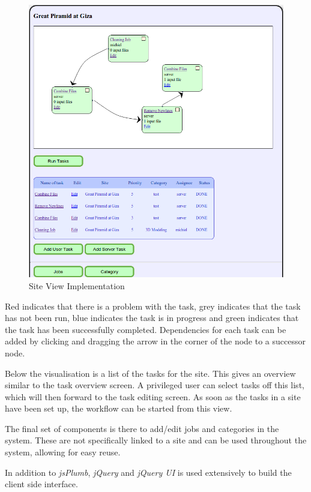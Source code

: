 \documentclass[12pt,a4paper]{report}
\begin{document}
\begin{description}
\begin{figure}[!h]
\begin{center}
            \includegraphics[scale=0.35]{figures/site_view_impl2.png}
        \end{center}
        \caption{Site View Implementation}
        \label{site_view_impl2}
    \end{figure}
    Red indicates that there is a problem with the task, grey indicates that the task has not
    been run, blue indicates the task is in progress and green indicates that
    the task has been successfully completed. Dependencies for each task can be
    added by clicking and dragging the arrow in the corner of the node to a
    successor node.

    Below the visualisation is a list of the tasks for the site. This gives an overview
    similar to the task overview screen. A privileged user can select tasks off
    this list, which will then forward to the task editing screen.
    As soon as the tasks in a site have been set up, the workflow can be started from this view.

    The final set of components is there to add/edit jobs and categories in the system. These
    are not specifically linked to a site and can be used throughout the  system, allowing
    for easy reuse.

\end{description}
In addition to \emph{jsPlumb}, \emph{jQuery} and \emph{jQuery UI} is used extensively to build
the client side interface.
\end{document}
